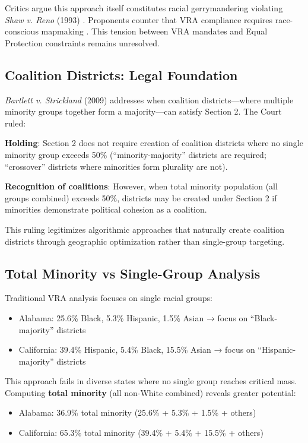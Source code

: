 Critics argue this approach itself constitutes racial gerrymandering violating \textit{Shaw v. Reno} (1993) \citep{shaw1993}. Proponents counter that VRA compliance requires race-conscious mapmaking \citep{pildes1997}. This tension between VRA mandates and Equal Protection constraints remains unresolved.

\subsection{Coalition Districts: Legal Foundation}

\textit{Bartlett v. Strickland} (2009) \citep{bartlett2009} addresses when coalition districts—where multiple minority groups together form a majority—can satisfy Section 2. The Court ruled:

\textbf{Holding}: Section 2 does not require creation of coalition districts where no single minority group exceeds 50\% (``minority-majority'' districts are required; ``crossover'' districts where minorities form plurality are not).

\textbf{Recognition of coalitions}: However, when total minority population (all groups combined) exceeds 50\%, districts may be created under Section 2 if minorities demonstrate political cohesion as a coalition.

This ruling legitimizes algorithmic approaches that naturally create coalition districts through geographic optimization rather than single-group targeting.

\subsection{Total Minority vs Single-Group Analysis}

Traditional VRA analysis focuses on single racial groups:
\begin{itemize}
\item Alabama: 25.6\% Black, 5.3\% Hispanic, 1.5\% Asian → focus on ``Black-majority'' districts
\item California: 39.4\% Hispanic, 5.4\% Black, 15.5\% Asian → focus on ``Hispanic-majority'' districts
\end{itemize}

This approach fails in diverse states where no single group reaches critical mass. Computing \textbf{total minority} (all non-White combined) reveals greater potential:
\begin{itemize}
\item Alabama: 36.9\% total minority (25.6\% + 5.3\% + 1.5\% + others)
\item California: 65.3\% total minority (39.4\% + 5.4\% + 15.5\% + others)
\end{itemize}

